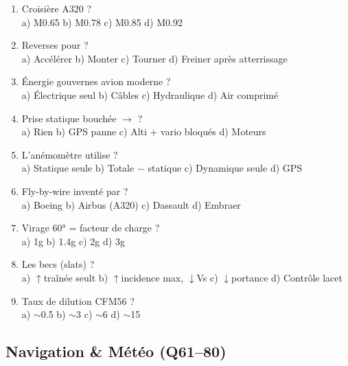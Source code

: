 \begin{enumerate}[nosep, start=41]
\item Croisière A320 ? \\ a) M0.65 \quad b) M0.78 \quad c) M0.85 \quad d) M0.92

\item Reverses pour ? \\ a) Accélérer \quad b) Monter \quad c) Tourner \quad d) Freiner après atterrissage

\item Énergie gouvernes avion moderne ? \\ a) Électrique seul \quad b) Câbles \quad c) Hydraulique \quad d) Air comprimé

\item Prise statique bouchée $\to$ ? \\ a) Rien \quad b) GPS panne \quad c) Alti + vario bloqués \quad d) Moteurs

\item L'anémomètre utilise ? \\ a) Statique seule \quad b) Totale $-$ statique \quad c) Dynamique seule \quad d) GPS

\item Fly-by-wire inventé par ? \\ a) Boeing \quad b) Airbus (A320) \quad c) Dassault \quad d) Embraer

\item Virage 60° = facteur de charge ? \\ a) 1g \quad b) 1.4g \quad c) 2g \quad d) 3g

\item Les becs (slats) ? \\ a) $\uparrow$traînée seult \quad b) $\uparrow$incidence max, $\downarrow$Vs \quad c) $\downarrow$portance \quad d) Contrôle lacet

\item Taux de dilution CFM56 ? \\ a) $\sim$0.5 \quad b) $\sim$3 \quad c) $\sim$6 \quad d) $\sim$15
\end{enumerate}

\subsection*{Navigation \& Météo (Q61--80)}

